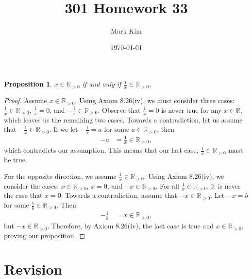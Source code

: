 \documentclass[12pt]{amsart}
\title{301 Homework 33}
\author{Mark Kim}
\date{\today}
\newcommand{\R}{\mathbb{R}}
\newtheorem*{proposition}{Proposition}
\begin{document}
\maketitle

\begin{proposition}
$x\in\R_{>0}$ if and only if $\frac{1}{x}\in\R_{>0}$.
\end{proposition}

\begin{proof}
Assume $x\in\R_{>0}$.  Using Axiom 8.26(iv), we must consider three cases: $\frac{1}{x}\in\R_{>0}$, $\frac{1}{x}=0$, and $-\frac{1}{x}\in\R_{>0}$.  Observe that $\frac{1}{x}=0$ is never true for any $x\in\R$, which leaves us the remaining two cases.  Towards a contradiction, let us assume that $-\frac{1}{x}\in\R_{>0}$.  If we let $-\frac{1}{x} = a$ for some $a\in\R_{>0}$, then
\begin{align*}
-a &= \frac{1}{x}\in\R_{>0},
\end{align*}
which contradicts our assumption.  This means that our last case, $\frac{1}{x}\in\R_{>0}$ must be true.

For the opposite direction, we assume $\frac{1}{x}\in\R_{>0}$.  Using Axiom 8.26(iv), we consider the cases: $x\in\R_{>0}$, $x=0$, and $-x\in\R_{>0}$.  For all $\frac{1}{x}\in\R_{>0}$, it is never the case that $x=0$.  Towards a contradiction, assume that $-x\in\R_{>0}$.  Let $-x = b$ for some $\frac{1}{b}\in\R_{>0}$.  Then
\begin{align*}
-\frac{1}{b} &= x\in\R_{>0},
\end{align*}
but $-x\in\R_{>0}$.  Therefore, by Axiom 8.26(iv), the last case is true and $x\in\R_{>0}$, proving our proposition.
\end{proof}

\section*{Revision}
\end{document}
